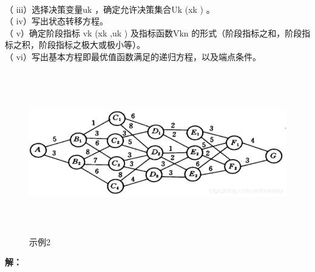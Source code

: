 \documentclass[a4paper,20pt]{article}
\begin{document}
\\（ iii）选择决策变量uk ，确定允许决策集合Uk (xk ) 。
\\（ iv）写出状态转移方程。
\\（ v）确定阶段指标 vk (xk ,uk ) 及指标函数Vkn 的形式（阶段指标之和，阶段指标之积，阶段指标之极大或极小等）。
\\（ vi）写出基本方程即最优值函数满足的递归方程，以及端点条件。
\begin{center}
    \begin{figure}[h]
        \includegraphics[width=340pt,height=200pt]{figure1.png}
        \caption{示例2}
    \end{figure}
\end{center}
\par \noindent \textbf{解：}
\end{document}
